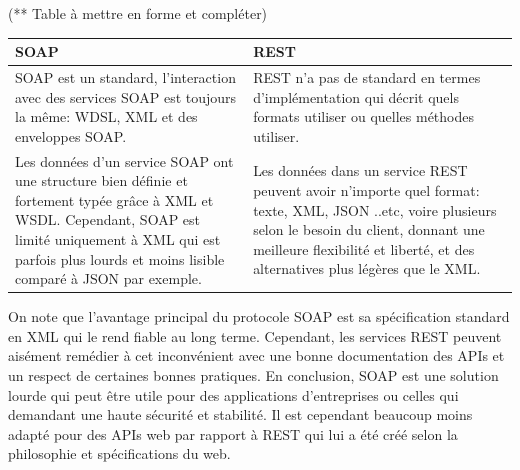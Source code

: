 (** Table à mettre en forme et compléter)\newline
\begin{tabu} to \textwidth { | X[l] | X[l] | }
\hline
{} 
SOAP & REST \\
\hline
   SOAP est un standard, l'interaction avec des services SOAP est toujours la même: WDSL, XML et des enveloppes SOAP.
   &
   REST n'a pas de standard en termes d'implémentation qui décrit quels formats utiliser ou quelles méthodes utiliser. \\
   \hline
   Les données d'un service SOAP ont une structure bien définie et fortement typée grâce à XML et WSDL.
   Cependant, SOAP est limité uniquement à XML qui est parfois plus lourds et moins lisible comparé à JSON par exemple.
   &  
   Les données dans un service REST peuvent avoir n'importe quel format: texte, XML, JSON ..etc, voire plusieurs selon le besoin du client, donnant une meilleure flexibilité et liberté, et des alternatives plus légères que le XML.\\
   \hline
\end{tabu}
   \label{tableSoapVsRest}

On note que l'avantage principal du protocole SOAP est sa spécification standard en XML qui le rend fiable au long terme. Cependant, les services REST peuvent aisément remédier à cet inconvénient avec une bonne documentation des APIs et un respect de certaines bonnes pratiques.
\newline
En conclusion, SOAP est une solution lourde qui peut être utile pour des applications d'entreprises ou celles qui demandant une haute sécurité et stabilité. Il est cependant beaucoup moins adapté pour des APIs web par rapport à REST qui lui a été créé selon la philosophie et spécifications du web.

